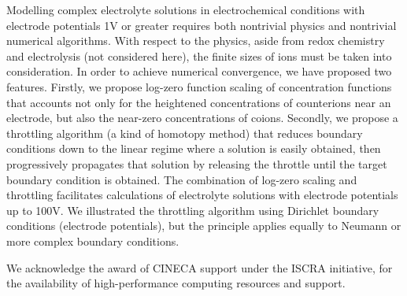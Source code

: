 Modelling complex electrolyte solutions in electrochemical conditions
with electrode potentials 1V or greater requires both nontrivial
physics and nontrivial numerical algorithms.
With respect to the
physics, aside from redox chemistry and electrolysis (not considered
here), the finite sizes of ions must be taken into consideration. In
order to achieve numerical convergence, we have proposed two
features. Firstly, we propose log-zero function scaling of
concentration functions that accounts
not only for the heightened concentrations of counterions near an
electrode, but also the near-zero concentrations of coions. Secondly,
we propose a throttling algorithm (a kind of homotopy method) that reduces boundary conditions
down to the linear regime where a solution is easily obtained, then
progressively propagates that solution by releasing the throttle
until the target boundary condition is obtained. The combination of
log-zero scaling and throttling facilitates calculations of electrolyte
solutions with electrode potentials up to 100V. We
illustrated the throttling algorithm using Dirichlet boundary
conditions (electrode potentials), but the  principle applies
equally to Neumann or more complex boundary conditions.

\begin{acknowledgement}
  We acknowledge the award of CINECA support under the ISCRA
  initiative, for the availability of high-performance computing
  resources and support.
\end{acknowledgement}





